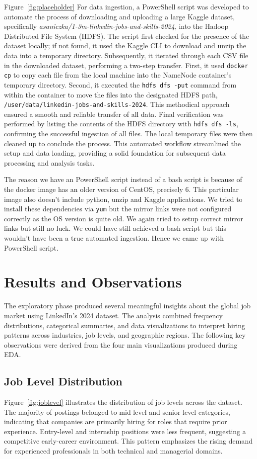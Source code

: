 \documentclass[conference]{IEEEtran}
\begin{document}
Figure~\ref{fig:placeholder} For data ingestion, a PowerShell script was developed to automate the process of downloading and uploading a large Kaggle dataset, specifically \textit{asaniczka/1-3m-linkedin-jobs-and-skills-2024}, into the Hadoop Distributed File System (HDFS). The script first checked for the presence of the dataset locally; if not found, it used the Kaggle CLI to download and unzip the data into a temporary directory. Subsequently, it iterated through each CSV file in the downloaded dataset, performing a two-step transfer. First, it used \texttt{docker cp} to copy each file from the local machine into the NameNode container's temporary directory. Second, it executed the \texttt{hdfs dfs -put} command from within the container to move the files into the designated HDFS path, \texttt{/user/data/linkedin-jobs-and-skills-2024}. This methodical approach ensured a smooth and reliable transfer of all data. Final verification was performed by listing the contents of the HDFS directory with \texttt{hdfs dfs -ls}, confirming the successful ingestion of all files. The local temporary files were then cleaned up to conclude the process. This automated workflow streamlined the setup and data loading, providing a solid foundation for subsequent data processing and analysis tasks.

The reason we have an PowerShell script instead of a bash script is because of the docker image has an older version of CentOS, precisely 6.
This particular image also doesn't include python, unzip and Kaggle applications. We tried to install these dependencies via \texttt{yum} but the mirror links were not configured correctly as the OS version is quite old. We again tried to setup correct mirror links but still no luck. We could have still achieved a bash script but this wouldn't have been a true automated ingestion. Hence we came up with PowerShell script.

\section{\textbf{Results and Observations}}
The exploratory phase produced several meaningful insights about the global job market using LinkedIn's 2024 dataset. The analysis combined frequency distributions, categorical summaries, and data visualizations to interpret hiring patterns across industries, job levels, and geographic regions. The following key observations were derived from the four main visualizations produced during EDA.

\subsection{Job Level Distribution}
Figure~\ref{fig:joblevel} illustrates the distribution of job levels across the dataset. The majority of postings belonged to mid-level and senior-level categories, indicating that companies are primarily hiring for roles that require prior experience. Entry-level and internship positions were less frequent, suggesting a competitive early-career environment. This pattern emphasizes the rising demand for experienced professionals in both technical and managerial domains.
\end{document}
